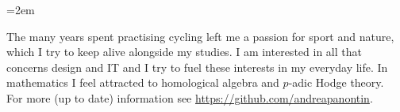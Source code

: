\documentclass{scrartcl}
\newcommand{\MarginText}[1]{\marginpar{\raggedleft\itshape\small#1}} %
\newcommand{\Description}[1]{\hangindent=2em\hangafter=0\noindent\raggedright\footnotesize{#1}\par\normalsize\vspace{1em}} %
\begin{document}
\begin{cv}{
}
\vspace{1em} %


\Description{\MarginText{Personal}The many years spent practising cycling
left me a passion for sport and nature, which I try to keep alive alongside my studies. %
I am interested in all that concerns design and IT
and I try to fuel these interests in my everyday life.\newline
In mathematics I feel attracted to homological algebra
and $p$-adic Hodge theory.\\
For more (up to date) information see 
\href{https://github.com/andreapanontin}{https://github.com/andreapanontin}.}





\end{cv}
\end{document}
